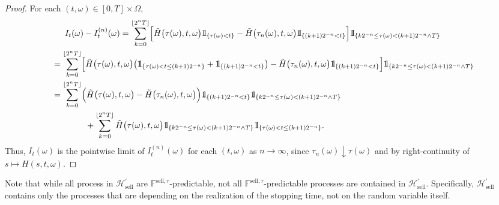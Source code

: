 \documentclass{article}
\def\ind{{\mathchoice{1\mskip-4mu\mathrm l}{1\mskip-4mu\mathrm l}
		{1\mskip-4.5mu\mathrm l}{1\mskip-5mu\mathrm l}}}
\begin{document}
\begin{proof}
	For each $(t, \omega)\in [0, T]\times \Omega$, 
	\begin{align*}
		&\phantom{==}I_t(\omega) - I^{(n)}_t(\omega)= \sum_{k=0}^{\lfloor 2^nT\rfloor} \Bigl[\tilde{H}\bigl(\tau(\omega),t,\omega\bigr)
		\ind_{\{\tau(\omega)<t\}}- \tilde{H}\bigl(\tau_n(\omega),t,\omega\bigr) \ind_{\{(k+1)2^{-n}<t\}}\Bigr]
		\ind_{\{k2^{-n} \leq \tau(\omega)< (k+1)2^{-n} \wedge T\} }\\
		& = \sum_{k=0}^{\lfloor 2^nT\rfloor} \Bigl[\tilde{H}\bigl(\tau(\omega),t,\omega\bigr)
		\bigl( \ind_{\{\tau(\omega)<t\leq (k+1)2^{-n}\}} + \ind_{\{(k+1)2^{-n}<t\}} \bigr) - \tilde{H}\bigl(\tau_n(\omega),t,\omega\bigr)
		\ind_{\{(k+1)2^{-n}<t\}}\Bigr] \ind_{\{k2^{-n} \leq \tau(\omega)< (k+1)2^{-n} \wedge T \} }\\
		& = \sum_{k=0}^{\lfloor 2^nT\rfloor} \Bigl(\tilde{H}\bigl(\tau(\omega),t,\omega\bigr)- \tilde{H}\bigl(\tau_n(\omega),t,\omega\bigr) \Bigr)
		\ind_{\{(k+1)2^{-n}<t\}}\ind_{\{k2^{-n} \leq \tau(\omega)< (k+1)2^{-n} \wedge T\} } \\
		&\qquad \qquad+ \sum_{k=0}^{\lfloor 2^nT\rfloor}  \tilde{H}\bigl(\tau(\omega),t,\omega\bigr)\ind_{\{k2^{-n} \leq \tau(\omega)< (k+1)2^{-n} \wedge T \} }  \ind_{\{\tau(\omega)<t\leq (k+1)2^{-n}\}} .
	\end{align*}
	Thus, $I_t(\omega)$ is the pointwise limit of $I^{(n)}_t(\omega)$ for each $(t, \omega)$ as $n\to\infty$, since  $\tau_n(\omega)\downarrow \tau(\omega)$ and by 			right-continuity of $s\mapsto H(s,t,\omega)$. 
\end{proof}

Note that while all process in $\mathcal{H}^\prime_\text{sell}$ are $\mathbb{F}^{\text{sell},\tau}$-predictable, not all $\mathbb{F}^{\text{sell},\tau}$-predictable processes are contained in $\mathcal{H}^\prime_\text{sell}$. Specifically, $\mathcal{H}^\prime_\text{sell}$ contains only the processes that are depending on the realization of the stopping time, not on the random variable itself.
\end{document}
